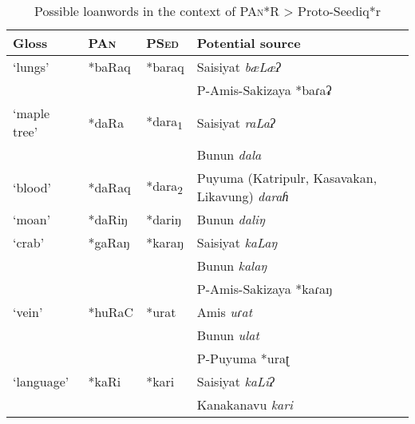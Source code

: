 \documentclass[12pt]{article}
\renewcommand{\arraystretch}{2} %
\newcommand{\pan}{\textsc{PAn}\xspace}
\newcommand{\psed}{\textsc{PSed}\xspace}
\newcommand{\psedf}{Proto-Seediq\xspace}
\begin{document}
\begingroup
\renewcommand\arraystretch{1}
\begin{longtable}[c]{llll}
\caption{Possible loanwords in the context of \pan *R > \psedf *r}
\label{tab:gr2}\\
\hline
Gloss         & \pan            & \psed                  & Potential source                                       \\ \hline
\endfirsthead
%
\endhead
%
`lungs'       & *baRaq          & *baraq                 & Saisiyat \textit{bæLæʔ}                                \\
              &                 &                        & P-Amis-Sakizaya *baɾaʡ                                 \\
`maple tree'  & *daRa           & *dara\textsubscript{1} & Saisiyat \textit{raLaʔ}                                \\
              &                 &                        & Bunun \textit{dala}                                    \\
`blood'       & *daRaq          & *dara\textsubscript{2} & Puyuma (Katripulr, Kasavakan, Likavung) \textit{daraɦ} \\
`moan'        & *daRiŋ          & *dariŋ                 & Bunun \textit{daliŋ}                                   \\
`crab'        & *gaRaŋ          & *karaŋ                 & Saisiyat \textit{kaLaŋ}                                \\
              &                 &                        & Bunun \textit{kalaŋ}                                   \\
              &                 &                        & P-Amis-Sakizaya *kaɾaŋ                                 \\
`vein'        & *huRaC          & *urat                  & Amis \textit{uɾat}                                     \\
              &                 &                        & Bunun \textit{ulat}                                    \\
              &                 &                        & P-Puyuma *uraʈ                                         \\
`language'    & *kaRi           & *kari                  & Saisiyat \textit{kaLiʔ}                                \\
              &                 &                        & Kanakanavu \textit{kari}                               \\

\end{longtable}
\end{document}
